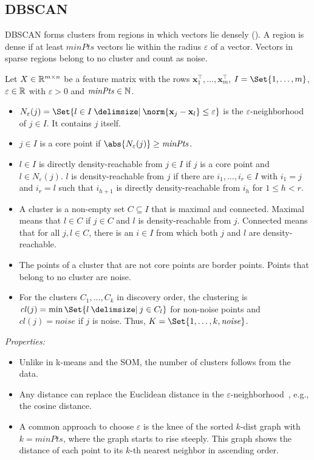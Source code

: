 \subsection{DBSCAN}
\label{sec:prelim:dbscan}
DBSCAN forms clusters from regions in which vectors lie densely (\textcite{ester1996density}). A region is dense if at least $\mathit{minPts}$ vectors lie within the radius $\varepsilon$ of a vector. Vectors in sparse regions belong to no cluster and count as noise.

\begin{definition}[DBSCAN]
	\label{def:prelim:dbscan}
	Let $X \in \mathbb R^{m \times n}$ be a feature matrix with the rows $\mathbf{x}_1^\top, \dots, \mathbf{x}_m^\top$, $I = \Set{1, \dots, m}$, $\varepsilon \in \mathbb R$ with $\varepsilon > 0$ and $\mathit{minPts} \in \mathbb N$.
	\begin{itemize}
		\item $N_\varepsilon(j) = \Set{l \in I \given \norm{\mathbf{x}_j - \mathbf{x}_l} \le \varepsilon}$ is the $\varepsilon$-neighborhood of $j \in I$. It contains $j$ itself.
		\item $j \in I$ is a core point if $\abs{N_\varepsilon(j)} \ge \mathit{minPts}$.
		\item $l \in I$ is directly density-reachable from $j \in I$ if $j$ is a core point and $l \in N_\varepsilon(j)$. $l$ is density-reachable from $j$ if there are $i_1, \dots, i_r \in I$ with $i_1 = j$ and $i_r = l$ such that $i_{h+1}$ is directly density-reachable from $i_h$ for $1 \le h < r$.
		\item A cluster is a non-empty set $C \subseteq I$ that is maximal and connected. Maximal means that $l \in C$ if $j \in C$ and $l$ is density-reachable from $j$. Connected means that for all $j, l \in C$, there is an $i \in I$ from which both $j$ and $l$ are density-reachable.
		\item The points of a cluster that are not core points are border points. Points that belong to no cluster are noise.
		\item For the clusters $C_1, \dots, C_k$ in discovery order, the clustering is $\mathit{cl}(j) = \min\Set{l \given j \in C_l}$ for non-noise points and $\mathit{cl}(j) = \mathit{noise}$ if $j$ is noise. Thus, $K = \Set{1, \dots, k, \mathit{noise}}$.
	\end{itemize}
\end{definition}

\noindent\emph{Properties:}
\begin{itemize}[beginpenalty=10000]
	\item Unlike in k-means and the SOM, the number of clusters follows from the data.
	\item Any distance can replace the Euclidean distance in the $\varepsilon$-neighborhood~\autocite{ester1996density}, e.g., the cosine distance.
	\item A common approach to choose $\varepsilon$ is the knee of the sorted $k$-dist graph with $k = \mathit{minPts}$, where the graph starts to rise steeply. This graph shows the distance of each point to its $k$-th nearest neighbor in ascending order.
\end{itemize}

